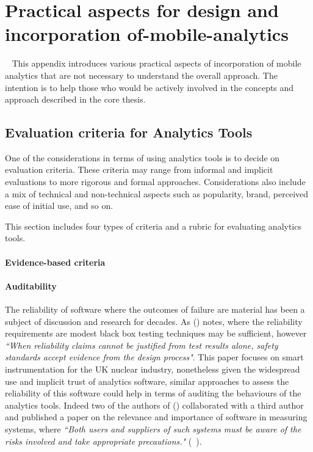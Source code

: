 \chapter{Practical aspects for design and incorporation of-mobile-analytics}~\label{practical-aspects-appendix}
This appendix introduces various practical aspects of incorporation of mobile analytics that are not necessary to understand the overall approach. The intention is to help those who would be actively involved in the concepts and approach described in the core thesis.


\section{Evaluation criteria for Analytics Tools}
One of the considerations in terms of using analytics tools is to decide on evaluation criteria. These criteria may range from informal and implicit evaluations to more rigorous and formal approaches. Considerations also include a mix of technical and non-technical aspects such as popularity, brand, perceived ease of initial use, and so on.

This section includes four types of criteria and a rubric for evaluating analytics tools.

\subsubsection{Evidence-based criteria}

\subsubsection{Auditability}
The reliability of software where the outcomes of failure are material has been a subject of discussion and research for decades. As (\cite{dobbing1998reliability}) notes, where the reliability requirements are modest black box testing techniques may be sufficient, however \emph{``When reliability claims cannot be justified from test results alone, safety standards accept evidence from the design process"}. This paper focuses on smart instrumentation for the UK nuclear industry, nonetheless given the widespread use and implicit trust of analytics software, similar approaches to assess the reliability of this software could help in terms of auditing the behaviours of the analytics tools. Indeed two of the authors of (\cite{dobbing1998reliability}) collaborated with a third author and published a paper on the relevance and importance of software in measuring systems, where \emph{``Both users and suppliers of such systems must be aware of the risks involved and take appropriate precautions."} (~\cite{wichmann2007software}).

